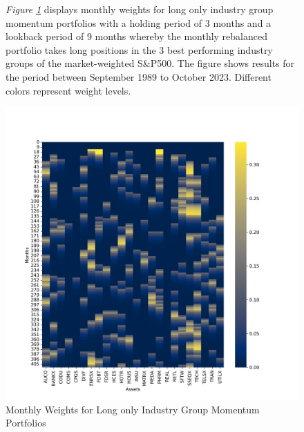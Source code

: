 \documentclass[a4paper,12pt,twoside]{article}
\begin{document}
\begin{figure}[H]
           \captionsetup{justification=centering}
   \caption{Monthly Weights for Long only Industry Group Momentum Portfolios}
    \label{fig_11}
    \textit{Figure \ref{fig_11}} displays monthly weights for long only industry group momentum portfolios with a holding period of 3 months and a lookback period of 9 months whereby the monthly rebalanced portfolio takes long positions in the 3 best performing industry groups of the market-weighted S\&P500. The figure shows results for the period between September 1989 to October 2023. Different colors represent weight levels.
    \centerline{\includegraphics[width=1\textwidth]{Plots/strategy_weights_long_IG.png}}
\end{figure} 
\end{document}
